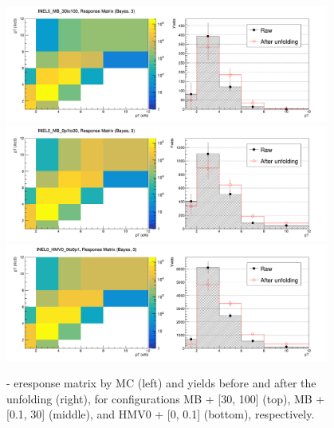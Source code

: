 \begin{appendix}
\begin{figure}[h]
    \centering
    \includegraphics[width=0.95\textwidth]{plots/s2_unfold_INEL0_MB_30to100.png} \\\vspace{5pt}
    \includegraphics[width=0.95\textwidth]{plots/s2_unfold_INEL0_MB_0p1to30.png} \\\vspace{5pt}
    \includegraphics[width=0.95\textwidth]{plots/s2_unfold_INEL0_HMV0_0to0p1.png}
    \caption{\Xic - e\Xim response matrix by MC (left) and yields before and after the unfolding (right), for configurations MB + [30, 100] (top), MB + [0.1, 30] (middle), and HMV0 + [0, 0.1] (bottom), respectively.}
    \label{fig:appB_unfold}
\end{figure}
\clearpage


\end{appendix}
